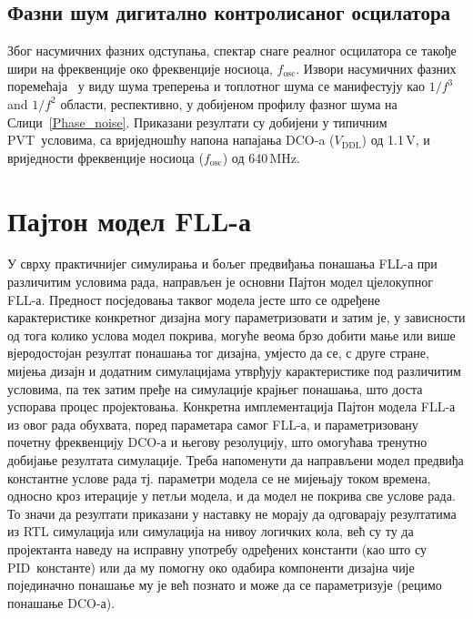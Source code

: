 \documentclass[master]{finthesis}
\def \FLL  {FLL} %
\def \DCO  {DCO} %
\def \PID  {PID} %
\def \PVT  {PVT} %
\begin{document}
\subsection{Фазни шум дигитално контролисаног осцилатора}
Због насумичних фазних одступања, спектар снаге реалног осцилатора се такође шири на фреквенције око фреквенције носиоца, $f_\text{osc}$. Извори насумичних фазних поремећаја~\cite{Milovanovic:8190103} у виду шума треперења и топлотног шума се манифестују као $1/f^3$ and $1/f^2$ области, респективно, у добијеном профилу фазног шума на Слици~\ref{Phase_noise}. Приказани резултати су добијени у типичним \PVT\ условима, са вриједношћу напона напајања \DCO-a ($V_\text{DDL}$) од 1.1\,V, и вриједности фреквенције носиоца ($f_\text{osc}$) од 640\,MHz.


\section{Пајтон модел \FLL-а} \label{section:python_model}
У сврху практичнијег симулирања и бољег предвиђања понашања \FLL-а при различитим условима рада, направљен је основни Пајтон модел цјелокупног \FLL-а. Предност посједовања таквог модела јесте што се одређене карактеристике конкретног дизајна могу параметризовати и затим је, у зависности од тога колико услова модел покрива, могуће веома брзо добити мање или више вјеродостојан резултат понашања тог дизајна, умјесто да се, с друге стране, мијења дизајн и додатним симулацијама утврђују карактеристике под различитим условима, па тек затим пређе на симулације крајњег понашања, што доста успорава процес пројектовања. Конкретна имплементација Пајтон модела \FLL-а из овог рада обухвата, поред параметара самог \FLL-а, и параметризовану почетну фреквенцију \DCO-а и његову резолуцију, што омогућава тренутно добијање резултата симулације. Треба напоменути да направљени модел предвиђа константне услове рада тј. параметри модела се не мијењају током времена, односно кроз итерације у петљи модела, и да модел не покрива све услове рада. То значи да резултати приказани у наставку не морају да одговарају резултатима из RTL симулација или симулација на нивоу логичких кола, већ су ту да пројектанта наведу на исправну употребу одређених константи (као што су \PID\ константе) или да му помогну око одабира компоненти дизајна чије појединачно понашање му је већ познато и може да се параметризује (рецимо понашање \DCO-а). \par
\end{document}
